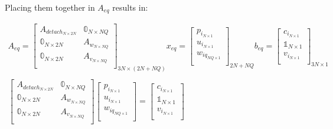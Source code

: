 \documentclass[conference]{IEEEtran}
\begin{document}
Placing them together in \(A_{eq}\) results in:

\begin{equation}
\begin{array}{c}
    A_{eq} =
    \begin{bmatrix}
        A_{detach_{N \times 2N}}    & \mathbb{0}_{N \times NQ} \\
        \mathbb{0}_{N \times 2N} & A_{w_{N \times NQ}}          \\
        \mathbb{0}_{N \times 2N} & A_{v_{N \times NQ}}          \\
    \end{bmatrix}_{3N \times (2N + NQ)}
    x_{eq} =
    \begin{bmatrix}
        p_{i_{N \times 1}} \\
        u_{i_{N \times 1}} \\
        w_{iq_{NQ \times 1}} \\
    \end{bmatrix}_{2N + NQ}
    b_{eq} =
    \begin{bmatrix}
        c_{i_{N \times 1}} \\
        \mathbb{1}_{N \times 1} \\
        v_{i_{N \times 1}} \\
    \end{bmatrix}_{3N \times 1} \\
    \\
    \begin{bmatrix}
        A_{detach_{N \times 2N}}    & \mathbb{0}_{N \times NQ} \\
        \mathbb{0}_{N \times 2N} & A_{w_{N \times NQ}}          \\
        \mathbb{0}_{N \times 2N} & A_{v_{N \times NQ}}          \\
    \end{bmatrix}
    \begin{bmatrix}
        p_{i_{N \times 1}} \\
        u_{i_{N \times 1}} \\
        w_{iq_{NQ \times 1}} \\
    \end{bmatrix}
    =
    \begin{bmatrix}
        c_{i_{N \times 1}} \\
        \mathbb{1}_{N \times 1} \\
        v_{i_{N \times 1}} \\
    \end{bmatrix}
\end{array}
\end{equation}
\end{document}
